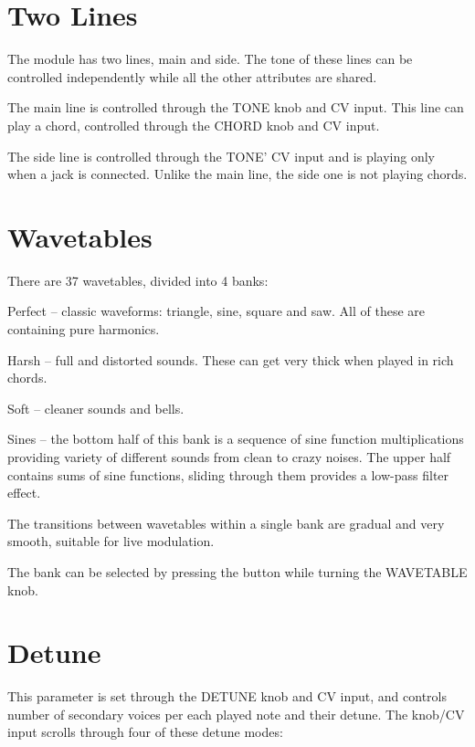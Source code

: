 \documentclass[10pt,nofoldmark,nocombine]{leaflet} %
\newenvironment{packed_enumerate_i}{
\begin{enumerate}[I]
  \setlength{\itemsep}{1pt}
  \setlength{\parskip}{0pt}
  \setlength{\parsep}{0pt}
}{\end{enumerate}}
\begin{document}
\section{Two Lines}

The module has two lines, main and side. The tone of these lines can be controlled independently while all the other attributes are shared.

The main line is controlled through the TONE knob and CV input. This line can play a chord, controlled through the CHORD knob and CV input.

The side line is controlled through the TONE' CV input and is playing only when a jack is connected. Unlike the main line, the side one is not playing chords.

\section{Wavetables}

There are 37 wavetables, divided into 4 banks:

\begin{packed_enumerate_i}
  \item Perfect -- classic waveforms: triangle, sine, square and saw. All of these are containing pure harmonics.
  \item Harsh -- full and distorted sounds. These can get very thick when played in rich chords.
  \item Soft -- cleaner sounds and bells.
  \item Sines -- the bottom half of this bank is a sequence of sine function multiplications providing variety of different sounds from clean to crazy noises. The upper half contains sums of sine functions, sliding through them provides a low-pass filter effect.
\end{packed_enumerate_i}

The transitions between wavetables within a single bank are gradual and very smooth, suitable for live modulation.

The bank can be selected by pressing the button while turning the WAVETABLE knob.

\section{Detune}

This parameter is set through the DETUNE knob and CV input, and controls number of secondary voices per each played note and their detune. The knob/CV input scrolls through four of these detune modes:
\end{document}
